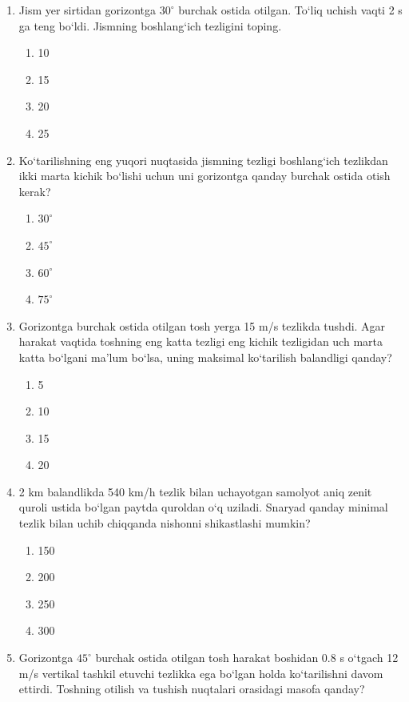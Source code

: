 \begin{enumerate}
\item Jism yer sirtidan gorizontga $30^\circ$ burchak ostida otilgan. To‘liq uchish vaqti 2 s ga teng bo‘ldi. Jismning boshlang‘ich tezligini toping.

\begin{enumerate}[label=\Alph*)]
\item 10
\item 15
\item 20
\item 25
\end{enumerate}

\item Ko‘tarilishning eng yuqori nuqtasida jismning tezligi boshlang‘ich tezlikdan ikki marta kichik bo‘lishi uchun uni gorizontga qanday burchak ostida otish kerak?

\begin{enumerate}[label=\Alph*)]
\item $30^\circ$
\item $45^\circ$
\item $60^\circ$
\item $75^\circ$
\end{enumerate}

\item Gorizontga burchak ostida otilgan tosh yerga 15 m/s tezlikda tushdi. Agar harakat vaqtida toshning eng katta tezligi eng kichik tezligidan uch marta katta bo‘lgani ma’lum bo‘lsa, uning maksimal ko‘tarilish balandligi qanday?

\begin{enumerate}[label=\Alph*)]
\item 5
\item 10
\item 15
\item 20
\end{enumerate}

\item 2 km balandlikda 540 km/h tezlik bilan uchayotgan samolyot aniq zenit quroli ustida bo‘lgan paytda quroldan o‘q uziladi. Snaryad qanday minimal tezlik bilan uchib chiqqanda nishonni shikastlashi mumkin?

\begin{enumerate}[label=\Alph*)]
\item 150
\item 200
\item 250
\item 300
\end{enumerate}

\item Gorizontga $45^\circ$ burchak ostida otilgan tosh harakat boshidan 0.8 s o‘tgach 12 m/s vertikal tashkil etuvchi tezlikka ega bo‘lgan holda ko‘tarilishni davom ettirdi. Toshning otilish va tushish nuqtalari orasidagi masofa qanday?


\end{enumerate}
